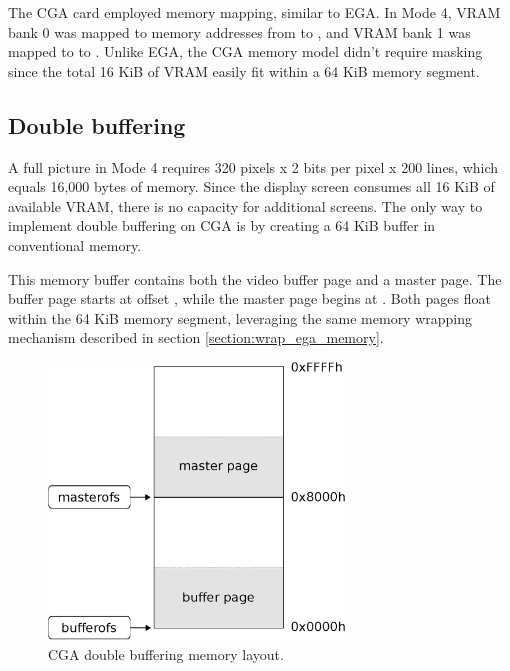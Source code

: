 \documentclass[book.tex]{subfiles}
\begin{document}
\par
The CGA card employed memory mapping, similar to EGA. In Mode 4, VRAM bank 0 was mapped to memory addresses from  to , and VRAM bank 1 was mapped to  to . Unlike EGA, the CGA memory model didn't require masking since the total 16 KiB of VRAM easily fit within a 64 KiB memory segment.



\subsection{Double buffering}
A full picture in Mode 4 requires 320 pixels x 2 bits per pixel x 200 lines, which equals 16,000 bytes of memory. Since the display screen consumes all 16 KiB of available VRAM, there is no capacity for additional screens. The only way to implement double buffering on CGA is by creating a 64 KiB buffer in conventional memory.\\

\par
\begin{minipage}{\textwidth}
  
\end{minipage}
\label{state_type}
\par
This memory buffer contains both the video buffer page and a master page. The buffer page starts at offset , while the master page begins at . Both pages float within the 64 KiB memory segment, leveraging the same memory wrapping mechanism described in section \ref{section:wrap_ega_memory}.\\

\begin{figure}[H]
\centering
\includegraphics[width=0.7\textwidth]{imgs/drawings/cga_screenseg.eps}
\caption{CGA double buffering memory layout.}
\label{fig:cga_screenseg}
\end{figure}
\end{document}
